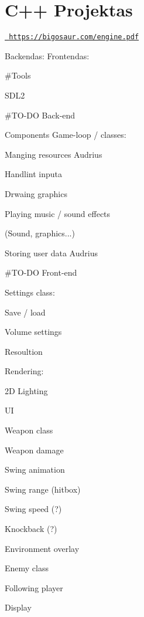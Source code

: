 \chapter{C++ Projektas}
\hypertarget{md__r_e_a_d_m_e}{}\label{md__r_e_a_d_m_e}
\label{md__r_e_a_d_m_e_autotoc_md2}%
%
 \href{https://bigosaur.com/engine.pdf}{\texttt{ https\+://bigosaur.\+com/engine.\+pdf}}

Backendas\+: Frontendas\+:

\#\+Tools

SDL2

\#\+TO-\/DO Back-\/end

Components Game-\/loop / classes\+:
\begin{DoxyItemize}
\item Manging resources Audrius
\item Handlint inputa
\item Drwaing graphics
\item Playing music / sound effects
\item {} (Sound, graphics...)
\item Storing user data Audrius
\end{DoxyItemize}

\#\+TO-\/DO Front-\/end

Settings class\+:
\begin{DoxyItemize}
\item Save / load
\item Volume settings
\item Resoultion
\end{DoxyItemize}

Rendering\+:
\begin{DoxyItemize}
\item 2D Lighting
\item {} UI
\end{DoxyItemize}

Weapon class
\begin{DoxyItemize}
\item Weapon damage
\item Swing animation
\item Swing range (hitbox)
\item Swing speed (?)
\item Knockback (?)
\end{DoxyItemize}

Environment overlay

Enemy class
\begin{DoxyItemize}
\item Following player
\item Display 
\end{DoxyItemize}